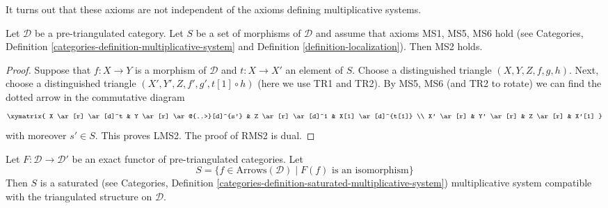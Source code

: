 \noindent
It turns out that these axioms are not independent of the
axioms defining multiplicative systems.

\begin{lemma}
\label{lemma-localization-conditions}
Let $\mathcal{D}$ be a pre-triangulated category.
Let $S$ be a set of morphisms of $\mathcal{D}$ and assume that axioms
MS1, MS5, MS6 hold (see
Categories, Definition \ref{categories-definition-multiplicative-system}
and
Definition \ref{definition-localization}).
Then MS2 holds.
\end{lemma}

\begin{proof}
Suppose that $f : X \to Y$ is a morphism of $\mathcal{D}$ and
$t : X \to X'$ an element of $S$. Choose a distinguished triangle
$(X, Y, Z, f, g, h)$. Next, choose a distinguished triangle
$(X', Y', Z, f', g', t[1] \circ h)$ (here we use TR1 and TR2).
By MS5, MS6 (and TR2 to rotate) we can find the dotted arrow
in the commutative diagram
$$
\xymatrix{
X \ar[r] \ar[d]^t &
Y \ar[r] \ar@{..>}[d]^{s'} &
Z \ar[r] \ar[d]^1 &
X[1] \ar[d]^{t[1]} \\
X' \ar[r] &
Y' \ar[r] &
Z \ar[r] &
X'[1]
}
$$
with moreover $s' \in S$. This proves LMS2. The proof of RMS2 is dual.
\end{proof}

\begin{lemma}
\label{lemma-triangle-functor-localize}
Let $F : \mathcal{D} \to \mathcal{D}'$ be an exact functor of
pre-triangulated categories.  Let
$$
S = \{f \in \text{Arrows}(\mathcal{D})
\mid F(f)\text{ is an isomorphism}\}
$$
Then $S$ is a saturated (see
Categories,
Definition \ref{categories-definition-saturated-multiplicative-system})
multiplicative system compatible with the
triangulated structure on $\mathcal{D}$.
\end{lemma}


